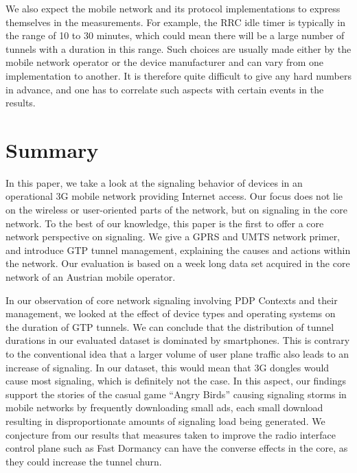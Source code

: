 We also expect the mobile network and its protocol implementations to express themselves in the measurements. For example, the \ac{RRC} idle timer is typically in the range of 10 to 30 minutes, which could mean there will be a large number of tunnels with a duration in this range. Such choices are usually made either by the mobile network operator or the device manufacturer and can vary from one implementation to another. It is therefore quite difficult to give any hard numbers in advance, and one has to correlate such aspects with certain events in the results.









\section{Summary}
\label{c4:sec:conclusion}
In this paper, we take a look at the signaling behavior of devices in an operational \ac{3G} mobile network providing Internet access. Our focus does not lie on the wireless or user-oriented parts of the network, but on signaling in the core network. To the best of our knowledge, this paper is the first to offer a core network perspective on signaling. We give a \ac{GPRS} and \ac{UMTS} network primer, and introduce \ac{GTP} tunnel management, explaining the causes and actions within the network. Our evaluation is based on a week long data set acquired in the core network of an Austrian mobile operator.

In our observation of core network signaling involving PDP Contexts and their management, we looked at the effect of device types and operating systems on the duration of GTP tunnels. We can conclude that the distribution of tunnel durations in our evaluated dataset is dominated by smartphones. This is contrary to the conventional idea that a larger volume of user plane traffic also leads to an increase of signaling. In our dataset, this would mean that 3G dongles would cause most signaling, which is definitely not the case. In this aspect, our findings support the stories of the casual game ``Angry Birds'' causing signaling storms in mobile networks by frequently downloading small ads, each small download resulting in disproportionate amounts of signaling load being generated. We conjecture from our results that measures taken to improve the radio interface control plane such as Fast Dormancy can have the converse effects in the core, as they could increase the tunnel churn.

